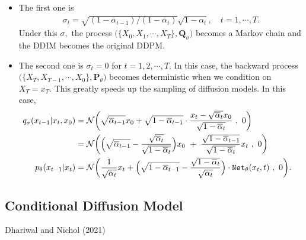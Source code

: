 \documentclass[
]{article}
\theoremstyle{remark}
\begin{document}
\begin{itemize}
\item
  The first one is \[
  \begin{aligned}
    \sigma_t = \sqrt{(1-\overline{\alpha}_{t-1})/(1-\overline{\alpha}_t)} \sqrt{ 1-\alpha_t }, \quad t = 1,\cdots, T.
  \end{aligned}
  \] Under this \(\sigma,\) the process
  \(\bigl(\lbrace X_0,X_1,\cdots,X_T \rbrace,\mathbf{Q}_{\sigma}\bigr)\)
  becomes a Markov chain and the DDIM becomes the original DDPM.
\item
  The second one is \(\sigma_t = 0\) for \(t=1,2,\cdots, T.\) In this
  case, the backward process
  \(\bigl(\lbrace X_T,X_{T-1},\cdots,X_0 \rbrace,\mathbf{P}_{\theta}\bigr)\)
  becomes deterministic when we condition on \(X_T = x_T.\) This greatly
  speeds up the sampling of diffusion models. In this case, \[
  \begin{aligned}
    q_{\sigma}(x_{t-1}\vert x_t,x_0) 
    &= \mathcal{N} \biggl( \sqrt{\overline{\alpha}_{t-1}}x_0 + \sqrt{1-\overline{\alpha}_{t-1} } \cdot \frac{x_t-\sqrt{\overline{\alpha}_t}x_0}{\sqrt{1-\overline{\alpha}_t}} \,\, , \,\, 0 \biggr) \cr 
    &= \mathcal{N} \biggl( \Bigl( \sqrt{\overline{\alpha}_{t-1}} - \frac{\sqrt{\overline{\alpha}_t}}{\sqrt{1-\overline{\alpha}_t}}  \Bigr) x_0 \,\, + \,\, \frac{\sqrt{1-\overline{\alpha}_{t-1}}}{\sqrt{1-\overline{\alpha}_t}} x_t 
    \,\, , \,\, 0 \biggr)  \cr
    p_{\theta}(x_{t-1}\vert x_t)
    &= \mathcal{N} \biggl(  
      \frac{1}{\sqrt{\alpha_t}} x_t + \Bigl( \sqrt{1-\overline{\alpha}_{t-1}}-\frac{\sqrt{1-\overline{\alpha}_t}}{\sqrt{\alpha_t}} \Bigr) \cdot  \mathtt{Net}_{\theta}(x_t,t)
      \,\, , \,\, 0 \biggr).
  \end{aligned}
  \]
\end{itemize}

\subsection{Conditional Diffusion Model}\label{sec-cdm}

Dhariwal and Nichol (2021)
\end{document}
